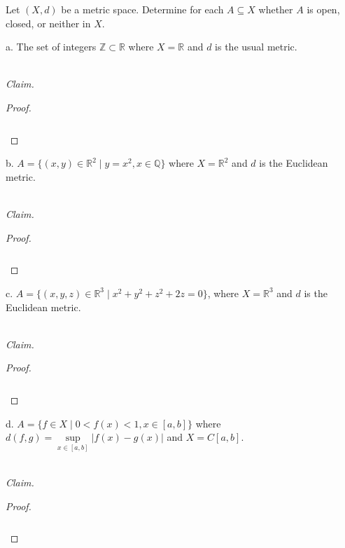 Let $(X, d)$ be a metric space. Determine for each $A \subseteq X$ whether $A$ is open, closed, or neither in $X$.

a.  The set of integers $\mathbb{Z} \subset \mathbb{R}$ where $X = \mathbb{R}$ and $d$ is the usual metric.

\ \\
\emph{Claim.} 

\begin{proof}\renewcommand{\qedsymbol}{}\ \\\\
    \begin{align*}
    \end{align*}
\end{proof}

\pagebreak

b.  $A = \{(x, y) \in \mathbb{R}^2 \mid y=x^2, x \in \mathbb{Q} \}$ where $X = \mathbb{R}^2$ and $d$ is the Euclidean
     metric.

\ \\
\emph{Claim.} 

\begin{proof}\renewcommand{\qedsymbol}{}\ \\\\
    \begin{align*}
    \end{align*}
\end{proof}

\pagebreak

c.  $A = \{(x, y, z) \in \mathbb{R}^3 \mid x^2 + y^2 + z^2 + 2z = 0 \}$, where $X = \mathbb{R}^3$ and $d$ is the 
    Euclidean metric.

\ \\
\emph{Claim.} 

\begin{proof}\renewcommand{\qedsymbol}{}\ \\\\
    \begin{align*}
    \end{align*}
\end{proof}

\pagebreak

d.  $A = \{ f \in X \mid 0 < f(x) < 1, x \in [a, b] \}$ where $d(f, g) = \sup\limits_{x \in [a, b]}{|f(x) - g(x)|}$ and 
    $X = C[a, b]$.

\ \\
\emph{Claim.} 

\begin{proof}\renewcommand{\qedsymbol}{}\ \\\\
    \begin{align*}
    \end{align*}
\end{proof}


